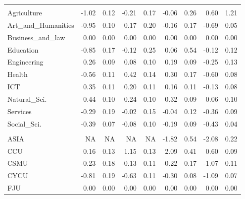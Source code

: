 \begin{longtable}[t]{lrrrrrrrr}
\endfoot
\bottomrule
\endlastfoot
\addlinespace[0.3em]
\multicolumn{9}{l}{\textit{\textbf{Panel A: }}}\\
\hspace{1em}Agriculture & -1.02 & 0.12 & -0.21 & 0.17 & -0.06 & 0.26 & 0.60 & 1.21\\
\hspace{1em}Art\_and\_Humanities & -0.95 & 0.10 & 0.17 & 0.20 & -0.16 & 0.17 & -0.69 & 0.05\\
\hspace{1em}Business\_and\_law & 0.00 & 0.00 & 0.00 & 0.00 & 0.00 & 0.00 & 0.00 & 0.00\\
\hspace{1em}Education & -0.85 & 0.17 & -0.12 & 0.25 & 0.06 & 0.54 & -0.12 & 0.12\\
\hspace{1em}Engineering & 0.26 & 0.09 & 0.08 & 0.10 & 0.19 & 0.09 & -0.25 & 0.13\\
\hspace{1em}Health & -0.56 & 0.11 & 0.42 & 0.14 & 0.30 & 0.17 & -0.60 & 0.08\\
\hspace{1em}ICT & 0.35 & 0.11 & 0.20 & 0.11 & 0.16 & 0.11 & -0.13 & 0.08\\
\hspace{1em}Natural\_Sci. & -0.44 & 0.10 & -0.24 & 0.10 & -0.32 & 0.09 & -0.06 & 0.10\\
\hspace{1em}Services & -0.29 & 0.19 & -0.02 & 0.15 & -0.04 & 0.12 & -0.36 & 0.09\\
\hspace{1em}Social\_Sci. & -0.39 & 0.07 & -0.08 & 0.10 & -0.19 & 0.09 & -0.43 & 0.04\\
\addlinespace[0.3em]
\multicolumn{9}{l}{\textit{\textbf{Panel B: }}}\\
\hspace{1em}ASIA & NA & NA & NA & NA & -1.82 & 0.54 & -2.08 & 0.22\\
\hspace{1em}CCU & 0.16 & 0.13 & 1.15 & 0.13 & 2.09 & 0.41 & 0.60 & 0.09\\
\hspace{1em}CSMU & -0.23 & 0.18 & -0.13 & 0.11 & -0.22 & 0.17 & -1.07 & 0.11\\
\hspace{1em}CYCU & -0.81 & 0.19 & -0.63 & 0.11 & -0.30 & 0.08 & -1.09 & 0.07\\
\hspace{1em}FJU & 0.00 & 0.00 & 0.00 & 0.00 & 0.00 & 0.00 & 0.00 & 0.00\\

\end{longtable}
